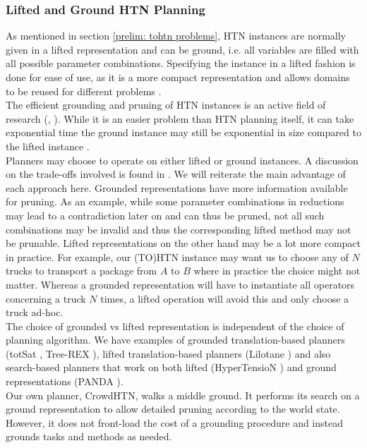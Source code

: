 \subsubsection{Lifted and Ground HTN Planning}
As mentioned in section \ref{prelim: tohtn problems}, HTN instances are normally given in a lifted representation and can be ground, i.e. all variables are filled with all possible parameter combinations. Specifying the instance in a lifted fashion is done for ease of use, as it is a more compact representation and allows domains to be reused for different problems \cite{behnke2020succinct}. \\
The efficient grounding and pruning of HTN instances is an active field of research (\cite{ramoul2017grounding}, \cite{behnke2020succinct}). While it is an easier problem than HTN planning itself, it can take exponential time the ground instance may still be exponential in size compared to the lifted instance \cite{behnke2020succinct}. \\
Planners may choose to operate on either lifted or ground instances. A discussion on the trade-offs involved is found in \cite{schreiber2021lilotane}. We will reiterate the main advantage of each approach here. Grounded representations have more information available for pruning. As an example, while some parameter combinations in reductions may lead to a contradiction later on and can thus be pruned, not all such combinations may be invalid and thus the corresponding lifted method may not be prunable. Lifted representations on the other hand may be a lot more compact in practice. For example, our (TO)HTN instance may want us to choose any of $N$ trucks to transport a package from $A$ to $B$ where in practice the choice might not matter. Whereas a grounded representation will have to instantiate all operators concerning a truck $N$ times, a lifted operation will avoid this and only choose a truck ad-hoc. \\
The choice of grounded vs lifted representation is independent of the choice of planning algorithm. We have examples of grounded translation-based planners (totSat \cite{behnke2018totsat}, Tree-REX \cite{schreiber2019tree}), lifted translation-based planners (Lilotane \cite{schreiber2021lilotane}) and also search-based planners that work on both lifted (HyperTensioN \cite{magnaguagno2020hypertension}) and ground representations (PANDA \cite{holler2020htn}). \\
Our own planner, CrowdHTN, walks a middle ground. It performs its search on a ground representation to allow detailed pruning according to the world state. However, it does not front-load the cost of a grounding procedure and instead grounds tasks and methods as needed.
